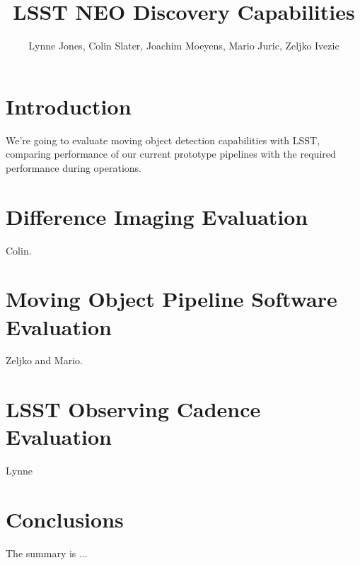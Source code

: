 \documentclass[12pt,preprint]{aastex}
\begin{document}
\title{LSST NEO Discovery Capabilities}

\author{Lynne Jones,  Colin Slater, Joachim Moeyens, Mario Juric, Zeljko Ivezic} %
\affil{}

\begin{abstract}

\end{abstract}

\keywords{}

\section{Introduction}

We're going to evaluate moving object detection capabilities with LSST, comparing performance of our current prototype pipelines with the required performance during operations.


\section{Difference Imaging Evaluation}

Colin.

\section{Moving Object Pipeline Software Evaluation}

Zeljko and Mario.


\section{LSST Observing Cadence Evaluation}

Lynne

\section{Conclusions}

The summary is ...


\end{document}
